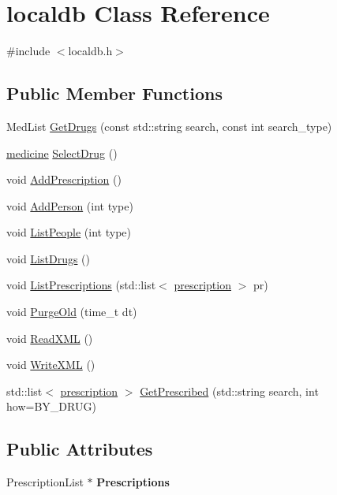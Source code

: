 \hypertarget{classlocaldb}{\section{localdb Class Reference}
\label{db/db5/classlocaldb}
}


{\ttfamily \#include $<$localdb.\-h$>$}

\subsection*{Public Member Functions}
\begin{DoxyCompactItemize}
\item 
Med\-List \hyperlink{classlocaldb_a78cfa790e464e1868e11664c85fd2f71}{Get\-Drugs} (const std\-::string search, const int search\-\_\-type)
\item 
\hyperlink{structmedicine}{medicine} \hyperlink{classlocaldb_a1208a5ed6ca28d850d01bac6e09b673d}{Select\-Drug} ()
\item 
void \hyperlink{classlocaldb_a90db632343f5cb21efce81507d5cff64}{Add\-Prescription} ()
\item 
void \hyperlink{classlocaldb_a4f24bb3dca226bf8e9dd3d923b82227b}{Add\-Person} (int type)
\item 
void \hyperlink{classlocaldb_a4fd1d418a8acc517cf40f53ca9451840}{List\-People} (int type)
\item 
void \hyperlink{classlocaldb_afb9a1b5b4ac821a205f4077b80c31c6a}{List\-Drugs} ()
\item 
void \hyperlink{classlocaldb_a03a61fd8105d78c2c91c852ac0f17c37}{List\-Prescriptions} (std\-::list$<$ \hyperlink{classprescription}{prescription} $>$ pr)
\item 
void \hyperlink{classlocaldb_a21b2b2a127e94fd6a2124fe21271016e}{Purge\-Old} (time\-\_\-t dt)
\item 
void \hyperlink{classlocaldb_a5baa1e7864c62df9af7a0cba5b7ae517}{Read\-X\-M\-L} ()
\item 
void \hyperlink{classlocaldb_a81660b43bd6e610c770ff3bcf5e4c72a}{Write\-X\-M\-L} ()
\item 
std\-::list$<$ \hyperlink{classprescription}{prescription} $>$ \hyperlink{classlocaldb_ab99fbc1662afc289a14311d04cf70efe}{Get\-Prescribed} (std\-::string search, int how=B\-Y\-\_\-\-D\-R\-U\-G)
\end{DoxyCompactItemize}
\subsection*{Public Attributes}
\begin{DoxyCompactItemize}
\item 
\hypertarget{classlocaldb_a7bf3e6a18894b23f5a2b120a71435cf1}{Prescription\-List $\ast$ {\bfseries Prescriptions}}\label{db/db5/classlocaldb_a7bf3e6a18894b23f5a2b120a71435cf1}

\end{DoxyCompactItemize}


